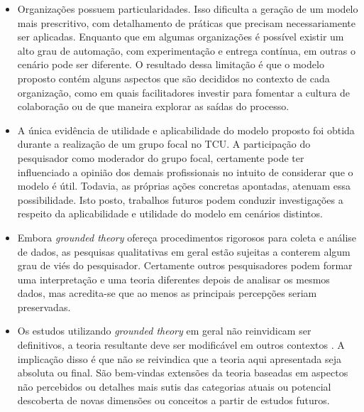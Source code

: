 \begin{itemize}
\item Organizações possuem particularidades. Isso dificulta a geração de um
modelo mais prescritivo, com detalhamento de práticas que precisam
necessariamente ser aplicadas. Enquanto que em algumas organizações é possível
existir um alto grau de automação, com experimentação e entrega contínua, em
outras o cenário pode ser diferente. O resultado dessa limitação é que o modelo
proposto contém alguns aspectos que são decididos no contexto de cada
organização, como em quais facilitadores investir para fomentar a cultura de
colaboração ou de que maneira explorar as saídas do processo.

\item A única evidência de utilidade e aplicabilidade do modelo proposto foi
obtida durante a realização de um grupo focal no \acrshort{TCU}. A participação
do pesquisador como moderador do grupo focal, certamente pode ter influenciado
a opinião dos demais profissionais no intuito de considerar que o modelo é útil.
Todavia, as próprias ações concretas apontadas, atenuam essa possibilidade. Isto
posto, trabalhos futuros podem conduzir investigações a respeito da
aplicabilidade e utilidade do modelo em cenários distintos. 

\item Embora {\it grounded theory} ofereça procedimentos rigorosos para coleta e
análise de dados, as pesquisas qualitativas em geral estão sujeitas a conterem
algum grau de viés do pesquisador. Certamente outros pesquisadores podem formar
uma interpretação e uma teoria diferentes depois de analisar os mesmos dados,
mas acredita-se que ao menos as principais percepções seriam preservadas.

\item Os estudos utilizando {\it grounded theory} em geral não reinvidicam ser
definitivos, a teoria resultante deve ser modificável em outros contextos \cite{hoda2012developing}.
A implicação disso é que não se reivindica que a teoria aqui apresentada seja
absoluta ou final. São bem-vindas extensões da teoria baseadas em aspectos não
percebidos ou detalhes mais sutis das categorias atuais ou potencial descoberta
de novas dimensões ou conceitos a partir de estudos futuros.
\end{itemize}
